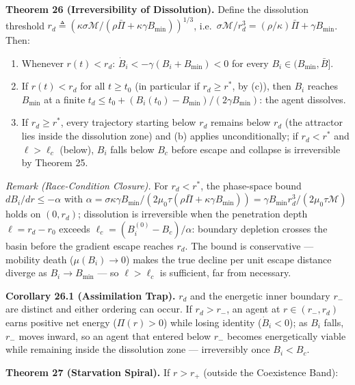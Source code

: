 \documentclass[11pt]{article}
\begin{document}
\textbf{Theorem 26 (Irreversibility of Dissolution).} Define the
dissolution threshold
\(r_d \triangleq (\kappa\sigma\mathcal{M}/(\rho\bar{\Pi} + \kappa\gamma B_{\min}))^{1/3}\),
i.e.~\(\sigma\mathcal{M}/r_d^3 = (\rho/\kappa)\bar{\Pi} + \gamma B_{\min}\).
Then:

\begin{enumerate}
\def\labelenumi{(\alph{enumi})}
\item
  Whenever \(r(t) < r_d\): \(\dot{B}_i < -\gamma(B_i + B_{\min}) < 0\)
  for every \(B_i \in (B_{\min}, \bar{B}]\).
\item
  If \(r(t) < r_d\) for all \(t \geq t_0\) (in particular if
  \(r_d \geq r^*\), by (c)), then \(B_i\) reaches \(B_{\min}\) at a
  finite \(t_d \leq t_0 + (B_i(t_0) - B_{\min})/(2\gamma B_{\min})\):
  the agent dissolves.
\item
  If \(r_d \geq r^*\), every trajectory starting below \(r_d\) remains
  below \(r_d\) (the attractor lies inside the dissolution zone) and (b)
  applies unconditionally; if \(r_d < r^*\) and \(\ell > \ell_c\)
  (below), \(B_i\) falls below \(B_c\) before escape and collapse is
  irreversible by Theorem 25.
\end{enumerate}

\emph{Remark (Race-Condition Closure).} For \(r_d < r^*\), the
phase-space bound \(dB_i/dr \leq -\alpha\) with
\(\alpha = \sigma\kappa\gamma B_{\min}/(2\mu_0\tau(\rho\bar{\Pi} + \kappa\gamma B_{\min})) = \gamma B_{\min} r_d^3/(2\mu_0\tau\mathcal{M})\)
holds on \((0, r_d)\); dissolution is irreversible when the penetration
depth \(\ell = r_d - r_0\) exceeds
\(\ell_c = (B_i^{(0)} - B_c)/\alpha\): boundary depletion crosses the
basin before the gradient escape reaches \(r_d\). The bound is
conservative --- mobility death (\(\mu(B_i) \to 0\)) makes the true
decline per unit escape distance diverge as \(B_i \to B_{\min}\) --- so
\(\ell > \ell_c\) is sufficient, far from necessary.

\textbf{Corollary 26.1 (Assimilation Trap).} \(r_d\) and the energetic
inner boundary \(r_-\) are distinct and either ordering can occur. If
\(r_d > r_-\), an agent at \(r \in (r_-, r_d)\) earns positive net
energy (\(\Pi(r) > 0\)) while losing identity (\(\dot{B}_i < 0\)); as
\(B_i\) falls, \(r_-\) moves inward, so an agent that entered below
\(r_-\) becomes energetically viable while remaining inside the
dissolution zone --- irreversibly once \(B_i < B_c\).

\textbf{Theorem 27 (Starvation Spiral).} If \(r > r_+\) (outside the
Coexistence Band):
\end{document}
